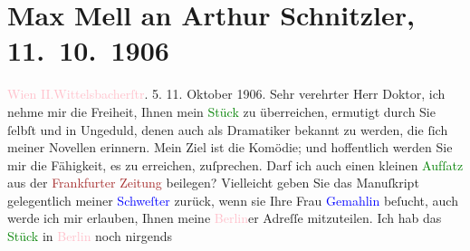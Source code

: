 

               \section[Max Mell an Arthur Schnitzler, 11. 10. 1906]{ Max Mell an Arthur Schnitzler, 11. 10. 1906}\nopagebreak{}\rehead{ }\normalsize\beginnumbering{} \toendnotes[C]{\smallbreak\pagebreak[2]} 
\toendnotes[C]{\smallbreak}\pstart
           \noindent{}\raggedleft{}{\pb}\textcolor{pink}{Wien II.}{}\ledrightnote{\textcolor{pink}{II., Leopoldstadt}}{ }\textcolor{pink}{Wittelsbacherſtr}{}\ledrightnote{\textcolor{pink}{Wittelsbachstraße}}. 5.\pend
           \pstart
           \raggedleft{}11. Oktober 1906.\pend
           \pstart{}Sehr verehrter Herr Doktor,\pend\pstart
           ich nehme mir die Freiheit, Ihnen mein \textcolor{green}{Stück}{} zu überreichen, ermutigt durch Sie ſelbſt und in Ungeduld, denen
                    auch als Dramatiker bekannt zu werden, die ſich meiner Novellen erinnern. Mein
                    Ziel ist die Komödie; und hoffentlich werden Sie mir die Fähigkeit, es zu
                    erreichen, zuſprechen.\pend
           \pstart
           Darf ich auch einen kleinen \textcolor{green}{Aufſatz}{}
                    aus der \textcolor{brown}{Frankfurter Zeitung}{}\ledrightnote{\textcolor{brown}{Frankfurter Zeitung}} beilegen?\pend
           \pstart
           Vielleicht geben Sie das Manuſkript gelegentlich meiner \textcolor{blue}{Schweſter}{} zurück, wenn sie Ihre Frau \textcolor{blue}{Gemahlin}{} beſucht, auch
                    werde ich mir erlauben, Ihnen meine \textcolor{pink}{Berlin}{}\ledrightnote{\textcolor{pink}{Berlin}}er
                    Adreſſe mitzuteilen. Ich hab das \textcolor{green}{Stück}{} in \textcolor{pink}{Berlin}{}\ledrightnote{\textcolor{pink}{Berlin}} noch nirgends

